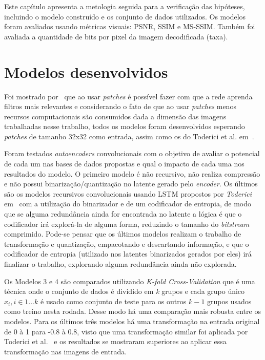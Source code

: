 Este capítulo apresenta a metologia seguida para a verificação das hipóteses, incluindo o modelo construído e os conjunto de dados utilizados. Os modelos foram avaliados usando métricas visuais: \acrshort{PSNR}, \acrshort{SSIM} e \acrshort{MS-SSIM}. Também foi avaliada a quantidade de bits por pixel da imagem decodificada (taxa). 

\section{Modelos desenvolvidos}
Foi mostrado por~\cite{krizhevsky2009, hou2016patch} que ao usar \textit{patches} é possível fazer com que a rede aprenda filtros mais relevantes e considerando o fato de que ao usar \textit{patches} menos recursos computacionais são consumidos dada a dimensão das imagens trabalhadas nesse trabalho, todos os modelos foram desenvolvidos esperando \textit{patches} de tamanho 32x32 como entrada, assim como os do Toderici et al. em~\cite{toderici2016}.

Foram testados \textit{autoencoders} convolucionais com o objetivo de avaliar o potencial de cada um nas bases de dados propostas e qual o impacto de cada uma nos resultados do modelo. O primeiro modelo é não recursivo, não realiza compressão e não possui binarização/quantização no latente gerado pelo \textit{encoder}. Os últimos são os modelos recursivos convolucionais usando \acrshort{LSTM} propostos por \textit{Toderici} em~\cite{toderici2017} com a utilização do binarizador e de um codificador de entropia, de modo que se alguma redundância ainda for encontrada no latente a lógica é que o codificador irá explorá-la de alguma forma, reduzindo o tamanho do \textit{bitstream} comprimido. Pode-se pensar que os últimos modelos realizam o trabalho de transformação e quantização, empacotando e descartando informação, e que o codificador de entropia (utilizado nos latentes binarizados gerados por eles) irá finalizar o trabalho, explorando alguma redundância ainda não explorada.

Os Modelos 3 e 4 são comparados utilizando \textit{K-fold Cross-Validation} que é uma técnica onde o conjunto de dados é dividido em \textit{k} grupos e cada grupo único $x_i, i \in {1 \dots k}$ é usado como conjunto de teste para os outros $k-1$ grupos usados como treino nesta rodada. Desse modo há uma comparação mais robusta entre os modelos. Para os últimos três modelos há uma transformação na entrada original de 0 à 1 para -0.8 à 0.8, visto que uma transformação similar foi aplicada por Toderici et al.~\cite{toderici2016} e os resultados se mostraram superiores ao aplicar essa transformação nas imagens de entrada.

